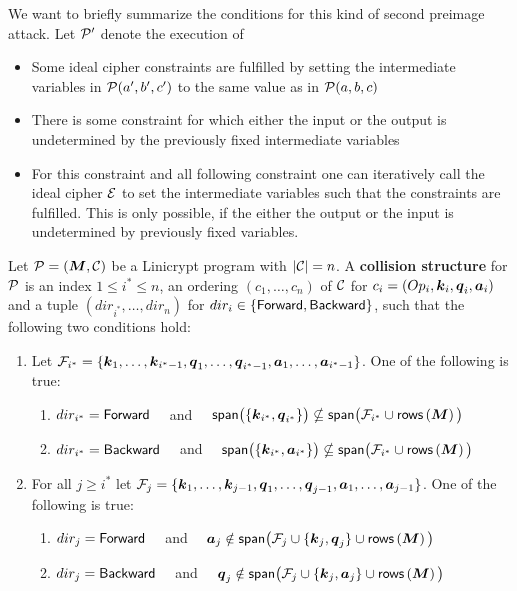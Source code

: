 We want to briefly summarize the conditions for this kind of second preimage attack.
Let $\P'$ denote the execution of 
\begin{itemize}
\item
    Some ideal cipher constraints are fulfilled by setting the intermediate variables in $\P(a',b',c')$ to the same value as in $\P(a,b,c)$ 
\item
    There is some constraint for which either the input or the output is undetermined by the previously fixed intermediate variables
\item
    For this constraint and all following constraint one can iteratively call the ideal cipher $\BC$ to set the intermediate variables such that the constraints are fulfilled.
    This is only possible, if the either the output or the input is undetermined by previously fixed variables.
\end{itemize}


\begin{defn}
Let $\P = (\M, \C)$ be a Linicrypt program with $|\C| = n$.
A \textbf{collision structure} for $\P$ is an index $1 \leq i^* \leq n$, an ordering $(c_1, \dots, c_n)$ of $\C$ for $c_i = (Op_i, \v k_i, \v q_i,\v a_i)$
and a tuple $(dir_{i^*}, \dots, dir_n)$ for $dir_i \in \{\For, \Back\}$,
such that the following two conditions hold:
\begin{enumerate}
\item 
Let $\mathcal{F}_\is = \{
    \v k_1, \dots, \v k_{i^* -1},
    \v q_1, \dots, \v q_{i^* -1},
    \v a_1, \dots, \v a_{i^* -1}
    \}$. One of the following is true:
        \begin{enumerate}
    \item $dir_\is = \For \quad$ and 
        $\quad
            \spn\big(\{ \v k_{i^*}, \v q_{i^*} \}\big) \nsubseteq
            \spn\big( \mathcal{F}_\is \cup \rows\left(\M\right) \big)
        $
    \item $dir_\is = \Back \quad$ and 
        $\quad
            \spn\big(\{ \v k_{i^*}, \v a_{i^*} \}\big) \nsubseteq
            \spn\big( \mathcal{F}_\is \cup \rows\left(\M\right) \big)
        $
\end{enumerate}
\item For all $j \geq i^*$ let $\mathcal{F}_j = \{
    \v k_1, \dots, \v k_{j -1},
    \v q_1, \dots, \v q_{j -1},
    \v a_1, \dots, \v a_{j -1}
    \}$. One of the following is true:
\begin{enumerate}
    \item $dir_j = \For \quad$ and 
        $\quad
        \v a_j \notin \spn\big(
        \mathcal{F}_j
        \cup \{ \v k_j, \v q_j\}
        \cup \rows\left(\M\right)
        \big)
        $
    \item $dir_j = \Back \quad$ and 
        $\quad
        \v q_j \notin \spn\big(
        \mathcal{F}_j
        \cup \{ \v k_j, \v a_j\}
        \cup \rows\left(\M\right)
        \big)
        $
\end{enumerate}
\end{enumerate}
\end{defn}

